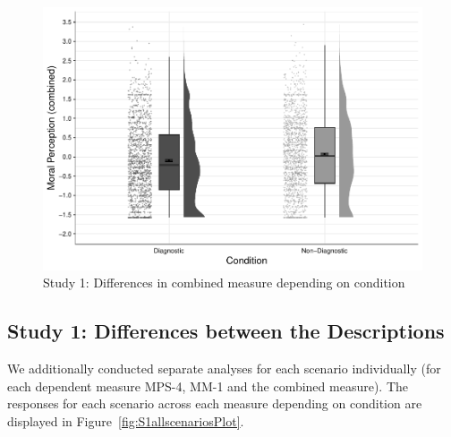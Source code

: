 \documentclass[
  man,floatsintext]{apa6}
\begin{document}
\begin{figure}[!h]
\includegraphics[width=\textwidth,]{Supplementary_files/figure-latex/S1combinedconditionplot-1} \caption{Study 1: Differences in combined measure depending on condition}\label{fig:S1combinedconditionplot}
\end{figure}

\newpage

\subsection{Study 1: Differences between the Descriptions}\label{study-1-differences-between-the-descriptions}

We additionally conducted separate analyses for each scenario individually (for each dependent measure MPS-4, MM-1 and the combined measure). The responses for each scenario across each measure depending on condition are displayed in Figure~\ref{fig:S1allscenariosPlot}.
\end{document}
